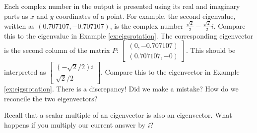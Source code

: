 \documentclass{ximera}
\begin{document}
\begin{example}
\begin{explanation}
        Each complex number in the output is presented using its real and imaginary parts as $x$ and $y$ coordinates of a point.  For example, the second eigenvalue, written as $(0.707107,-0.707107)$, is the complex number $\frac{\sqrt{2}}{2}-\frac{\sqrt{2}}{2}i$.  Compare this to the eigenvalue in Example \ref{ex:eigsrotation}.  The corresponding eigenvector is the second column of the matrix $P$: $\begin{bmatrix}(0,-0.707107)\\(0.707107,-0)\end{bmatrix}$.  This should be interpreted as $\begin{bmatrix}(-\sqrt{2}/2)i\\\sqrt{2}/2\end{bmatrix}$.  Compare this to the eigenvector in Example \ref{ex:eigsrotation}.  There is a discrepancy!  Did we make a mistake?  How do we reconcile the two eigenvectors?
        \begin{hint}
            Recall that a scalar multiple of an eigenvector is also an eigenvector.  What happens if you multiply our current answer by $i$?
        \end{hint}
        \end{explanation}
        \end{example}
\end{document}
